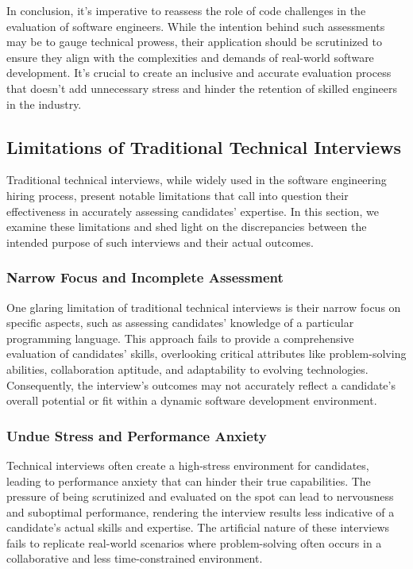 \documentclass[
    a4paper, %
    10pt, %
    unnumberedsections, %
    twoside, %
]{LTJournalArticle}
\begin{document}
In conclusion, it's imperative to reassess the role of code challenges in the evaluation of software engineers. While the intention behind such assessments may be to gauge technical prowess, their application should be scrutinized to ensure they align with the complexities and demands of real-world software development. It's crucial to create an inclusive and accurate evaluation process that doesn't add unnecessary stress and hinder the retention of skilled engineers in the industry.


\subsection{Limitations of Traditional Technical Interviews}

Traditional technical interviews, while widely used in the software engineering hiring process, present notable limitations that call into question their effectiveness in accurately assessing candidates' expertise. In this section, we examine these limitations and shed light on the discrepancies between the intended purpose of such interviews and their actual outcomes.

\subsubsection*{Narrow Focus and Incomplete Assessment}

One glaring limitation of traditional technical interviews is their narrow focus on specific aspects, such as assessing candidates' knowledge of a particular programming language. This approach fails to provide a comprehensive evaluation of candidates' skills, overlooking critical attributes like problem-solving abilities, collaboration aptitude, and adaptability to evolving technologies. Consequently, the interview's outcomes may not accurately reflect a candidate's overall potential or fit within a dynamic software development environment.

\subsubsection*{Undue Stress and Performance Anxiety}

Technical interviews often create a high-stress environment for candidates, leading to performance anxiety that can hinder their true capabilities. The pressure of being scrutinized and evaluated on the spot can lead to nervousness and suboptimal performance, rendering the interview results less indicative of a candidate's actual skills and expertise. The artificial nature of these interviews fails to replicate real-world scenarios where problem-solving often occurs in a collaborative and less time-constrained environment.
\end{document}

